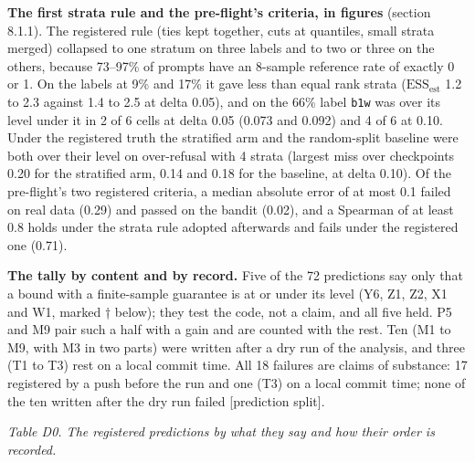 \documentclass[11pt]{article}
\begin{document}
\textbf{The first strata rule and the pre-flight's criteria, in figures} (section 8.1.1). The registered rule (ties kept together, cuts at quantiles, small strata merged) collapsed to one stratum on three labels and to two or three on the others, because 73--97\% of prompts have an 8-sample reference rate of exactly 0 or 1. On the labels at 9\% and 17\% it gave less than equal rank strata ($\mathrm{ESS}_{\mathrm{est}}$ 1.2 to 2.3 against 1.4 to 2.5 at delta 0.05), and on the 66\% label \texttt{b1w} was over its level under it in 2 of 6 cells at delta 0.05 (0.073 and 0.092) and 4 of 6 at 0.10. Under the registered truth the stratified arm and the random-split baseline were both over their level on over-refusal with 4 strata (largest miss over checkpoints 0.20 for the stratified arm, 0.14 and 0.18 for the baseline, at delta 0.10). Of the pre-flight's two registered criteria, a median absolute error of at most 0.1 failed on real data (0.29) and passed on the bandit (0.02), and a Spearman of at least 0.8 holds under the strata rule adopted afterwards and fails under the registered one (0.71).


\textbf{The tally by content and by record.} Five of the 72 predictions say only that a bound with a finite-sample guarantee is at or under its level (Y6, Z1, Z2, X1 and W1, marked † below); they test the code, not a claim, and all five held. P5 and M9 pair such a half with a gain and are counted with the rest. Ten (M1 to M9, with M3 in two parts) were written after a dry run of the analysis, and three (T1 to T3) rest on a local commit time. All 18 failures are claims of substance: 17 registered by a push before the run and one (T3) on a local commit time; none of the ten written after the dry run failed [prediction split].


\emph{Table D0. The registered predictions by what they say and how their order is recorded.}
\end{document}
